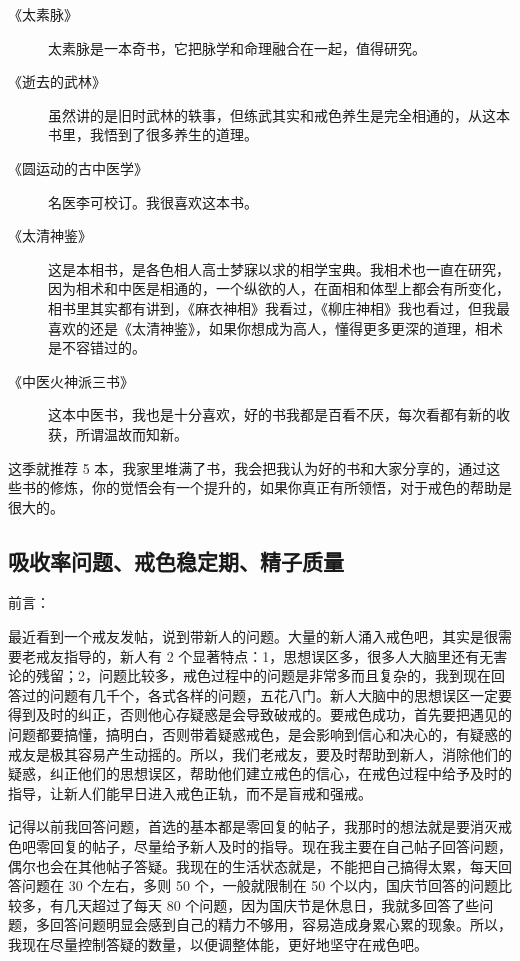 \documentclass[fontset=founder]{ctexart}
\begin{document}
\begin{description}
    \item[《太素脉》] 太素脉是一本奇书，它把脉学和命理融合在一起，值得研究。
    \item[《逝去的武林》] 虽然讲的是旧时武林的轶事，但练武其实和戒色养生是完全相通的，从这本书里，我悟到了很多养生的道理。
    \item[《圆运动的古中医学》] 名医李可校订。我很喜欢这本书。
    \item[《太清神鉴》] 这是本相书，是各色相人高士梦寐以求的相学宝典。我相术也一直在研究，因为相术和中医是相通的，一个纵欲的人，在面相和体型上都会有所变化，相书里其实都有讲到，《麻衣神相》我看过，《柳庄神相》我也看过，但我最喜欢的还是《太清神鉴》，如果你想成为高人，懂得更多更深的道理，相术是不容错过的。
    \item[《中医火神派三书》] 这本中医书，我也是十分喜欢，好的书我都是百看不厌，每次看都有新的收获，所谓温故而知新。
\end{description}

这季就推荐 5 本，我家里堆满了书，我会把我认为好的书和大家分享的，通过这些书的修炼，你的觉悟会有一个提升的，如果你真正有所领悟，对于戒色的帮助是很大的。

\subsection{吸收率问题、戒色稳定期、精子质量}

前言：

最近看到一个戒友发帖，说到带新人的问题。大量的新人涌入戒色吧，其实是很需要老戒友指导的，新人有 2 个显著特点：1，思想误区多，很多人大脑里还有无害论的残留；2，问题比较多，戒色过程中的问题是非常多而且复杂的，我到现在回答过的问题有几千个，各式各样的问题，五花八门。新人大脑中的思想误区一定要得到及时的纠正，否则他心存疑惑是会导致破戒的。要戒色成功，首先要把遇见的问题都要搞懂，搞明白，否则带着疑惑戒色，是会影响到信心和决心的，有疑惑的戒友是极其容易产生动摇的。所以，我们老戒友，要及时帮助到新人，消除他们的疑惑，纠正他们的思想误区，帮助他们建立戒色的信心，在戒色过程中给予及时的指导，让新人们能早日进入戒色正轨，而不是盲戒和强戒。

记得以前我回答问题，首选的基本都是零回复的帖子，我那时的想法就是要消灭戒色吧零回复的帖子，尽量给予新人及时的指导。现在我主要在自己帖子回答问题，偶尔也会在其他帖子答疑。我现在的生活状态就是，不能把自己搞得太累，每天回答问题在 30 个左右，多则 50 个，一般就限制在 50 个以内，国庆节回答的问题比较多，有几天超过了每天 80 个问题，因为国庆节是休息日，我就多回答了些问题，多回答问题明显会感到自己的精力不够用，容易造成身累心累的现象。所以，我现在尽量控制答疑的数量，以便调整体能，更好地坚守在戒色吧。
\end{document}
